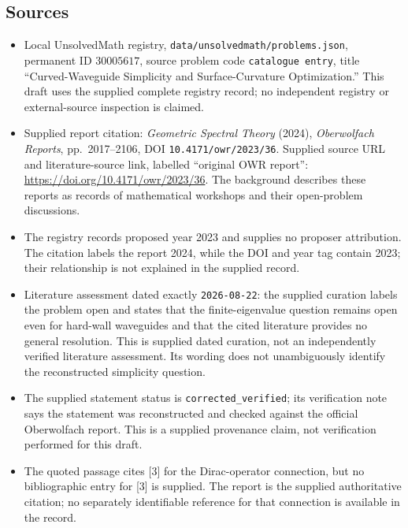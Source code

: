 \documentclass[11pt]{article}
\begin{document}
\subsection{Sources}
\begin{itemize}
\item Local UnsolvedMath registry, \texttt{data/unsolvedmath/problems.json}, permanent ID \(30005617\), source problem code \texttt{catalogue entry}, title ``Curved-Waveguide Simplicity and Surface-Curvature Optimization.'' This draft uses the supplied complete registry record; no independent registry or external-source inspection is claimed.
\item Supplied report citation: \emph{Geometric Spectral Theory} (2024), \emph{Oberwolfach Reports}, pp.\ 2017--2106, DOI \texttt{10.4171/owr/2023/36}. Supplied source URL and literature-source link, labelled ``original OWR report'': \url{https://doi.org/10.4171/owr/2023/36}. The background describes these reports as records of mathematical workshops and their open-problem discussions.
\item The registry records proposed year 2023 and supplies no proposer attribution. The citation labels the report 2024, while the DOI and year tag contain 2023; their relationship is not explained in the supplied record.
\item Literature assessment dated exactly \texttt{2026-08-22}: the supplied curation labels the problem open and states that the finite-eigenvalue question remains open even for hard-wall waveguides and that the cited literature provides no general resolution. This is supplied dated curation, not an independently verified literature assessment. Its wording does not unambiguously identify the reconstructed simplicity question.
\item The supplied statement status is \texttt{corrected\_verified}; its verification note says the statement was reconstructed and checked against the official Oberwolfach report. This is a supplied provenance claim, not verification performed for this draft.
\item The quoted passage cites [3] for the Dirac-operator connection, but no bibliographic entry for [3] is supplied. The report is the supplied authoritative citation; no separately identifiable reference for that connection is available in the record.
\end{itemize}
\end{document}

